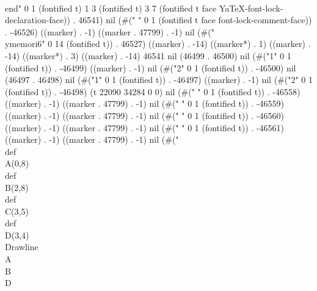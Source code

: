   \\end" 0 1 (fontified t) 1 3 (fontified t) 3 7 (fontified t face YaTeX-font-lock-declaration-face)) . 46541) nil (#("
" 0 1 (fontified t face font-lock-comment-face)) . -46526) ((marker) . -1) ((marker . 47799) . -1) nil (#("   \\ymemori{6}" 0 14 (fontified t)) . 46527) ((marker) . -14) ((marker*) . 1) ((marker) . -14) ((marker*) . 3) ((marker) . -14) 46541 nil (46499 . 46500) nil (#("1" 0 1 (fontified t)) . -46499) ((marker) . -1) nil (#("2" 0 1 (fontified t)) . -46500) nil (46497 . 46498) nil (#("1" 0 1 (fontified t)) . -46497) ((marker) . -1) nil (#("2" 0 1 (fontified t)) . -46498) (t 22090 34284 0 0) nil (#("
" 0 1 (fontified t)) . -46558) ((marker) . -1) ((marker . 47799) . -1) nil (#(" " 0 1 (fontified t)) . -46559) ((marker) . -1) ((marker . 47799) . -1) nil (#(" " 0 1 (fontified t)) . -46560) ((marker) . -1) ((marker . 47799) . -1) nil (#(" " 0 1 (fontified t)) . -46561) ((marker) . -1) ((marker . 47799) . -1) nil (#("\\def\\A{(0,8)}
   \\def\\B{(2,8)}
   \\def\\C{(3,5)}
   \\def\\D{(3,4)}
   \\Drawline{\\A\\B\\D}
